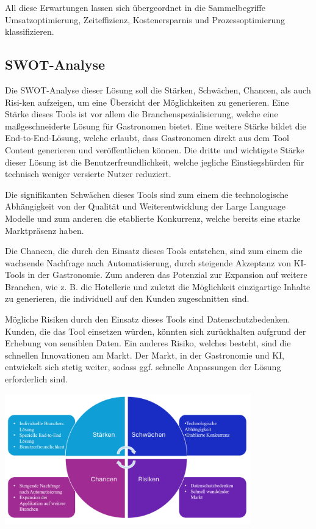All diese Erwartungen lassen sich übergeordnet in die Sammelbegriffe Umsatzoptimierung, Zeiteffizienz, Kostenersparnis und Prozessoptimierung klassifizieren.

\subsection{SWOT-Analyse}
Die SWOT-Analyse dieser Lösung soll die Stärken, Schwächen, Chancen, als auch Risi-ken aufzeigen, um eine Übersicht der Möglichkeiten zu generieren.
Eine Stärke dieses Tools ist vor allem die Branchenspezialisierung, welche eine maßgeschneiderte Lösung für Gastronomen bietet.
Eine weitere Stärke bildet die End-to-End-Lösung, welche erlaubt, dass Gastronomen direkt aus dem Tool Content generieren und veröffentlichen können.
Die dritte und wichtigste Stärke dieser Lösung ist die Benutzerfreundlichkeit, welche jegliche Einstiegshürden für technisch weniger versierte Nutzer reduziert.

Die signifikanten Schwächen dieses Tools sind zum einem die technologische Abhängigkeit von der Qualität und Weiterentwicklung der Large Language Modelle und zum anderen die etablierte Konkurrenz, welche bereits eine starke Marktpräsenz haben.

Die Chancen, die durch den Einsatz dieses Tools entstehen, sind zum einem die wachsende Nachfrage nach Automatisierung, durch steigende Akzeptanz von KI-Tools in der Gastronomie.
Zum anderen das Potenzial zur Expansion auf weitere Branchen, wie z. B. die Hotellerie und zuletzt die Möglichkeit einzigartige Inhalte zu generieren, die individuell auf den Kunden zugeschnitten sind.

Mögliche Risiken durch den Einsatz dieses Tools sind Datenschutzbedenken.
Kunden, die das Tool einsetzen würden, könnten sich zurückhalten aufgrund der Erhebung von sensiblen Daten.
Ein anderes Risiko, welches besteht, sind die schnellen Innovationen am Markt.
Der Markt, in der Gastronomie und KI, entwickelt sich stetig weiter, sodass ggf. schnelle Anpassungen der Lösung erforderlich sind.

\includegraphics[width=0.8\textwidth]{abbildungen/SWOT}

